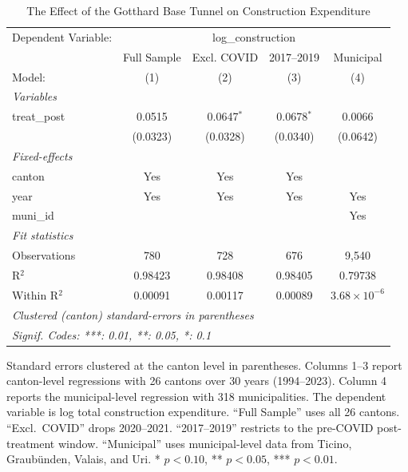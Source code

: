 
\begin{table}[htbp]
   \caption{\label{tab:main_did} The Effect of the Gotthard Base Tunnel on Construction Expenditure}
   \centering
   \begin{tabular}{lcccc}
      \tabularnewline \midrule \midrule
      Dependent Variable: & \multicolumn{4}{c}{log\_construction}\\
                   & Full Sample & Excl. COVID  & 2017--2019   & Municipal \\   
      Model:       & (1)         & (2)          & (3)          & (4)\\  
      \midrule
      \emph{Variables}\\
      treat\_post  & 0.0515      & 0.0647$^{*}$ & 0.0678$^{*}$ & 0.0066\\   
                   & (0.0323)    & (0.0328)     & (0.0340)     & (0.0642)\\   
      \midrule
      \emph{Fixed-effects}\\
      canton       & Yes         & Yes          & Yes          & \\  
      year         & Yes         & Yes          & Yes          & Yes\\  
      muni\_id     &             &              &              & Yes\\  
      \midrule
      \emph{Fit statistics}\\
      Observations & 780         & 728          & 676          & 9,540\\  
      R$^2$        & 0.98423     & 0.98408      & 0.98405      & 0.79738\\  
      Within R$^2$ & 0.00091     & 0.00117      & 0.00089      & $3.68\times 10^{-6}$\\   
      \midrule \midrule
      \multicolumn{5}{l}{\emph{Clustered (canton) standard-errors in parentheses}}\\
      \multicolumn{5}{l}{\emph{Signif. Codes: ***: 0.01, **: 0.05, *: 0.1}}\\
   \end{tabular}
   
   \par \raggedright 
   Standard errors clustered at the canton level in parentheses. Columns 1--3 report canton-level regressions with 26 cantons over 30 years (1994--2023). Column 4 reports the municipal-level regression with 318 municipalities. The dependent variable is log total construction expenditure. ``Full Sample'' uses all 26 cantons. ``Excl.\ COVID'' drops 2020--2021. ``2017--2019'' restricts to the pre-COVID post-treatment window. ``Municipal'' uses municipal-level data from Ticino, Graub\"unden, Valais, and Uri. * $p<0.10$, ** $p<0.05$, *** $p<0.01$.
\end{table}


